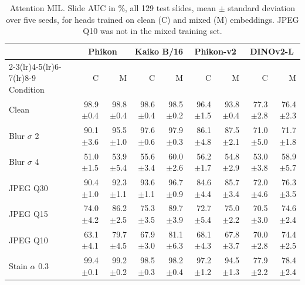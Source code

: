 \begin{table}[H]\centering\small
\caption{Attention MIL. Slide AUC in \%, all 129 test slides, mean $\pm$ standard deviation over five seeds, for heads trained on clean (C) and mixed (M) embeddings. JPEG Q10 was not in the mixed training set.}
\label{tab:app-abmil}
\setlength{\tabcolsep}{3.5pt}
\begin{tabular}{lrrrrrrrr}
\toprule
 & \multicolumn{2}{c}{Phikon} & \multicolumn{2}{c}{Kaiko B/16} & \multicolumn{2}{c}{Phikon-v2} & \multicolumn{2}{c}{DINOv2-L}\\
\cmidrule(lr){2-3}\cmidrule(lr){4-5}\cmidrule(lr){6-7}\cmidrule(lr){8-9}
Condition & C & M & C & M & C & M & C & M\\
\midrule
Clean & 98.9{\scriptsize$\pm$0.4} & 98.8{\scriptsize$\pm$0.4} & 98.6{\scriptsize$\pm$0.4} & 98.5{\scriptsize$\pm$0.2} & 96.4{\scriptsize$\pm$1.5} & 93.8{\scriptsize$\pm$0.4} & 77.3{\scriptsize$\pm$2.8} & 76.4{\scriptsize$\pm$2.3}\\
Blur $\sigma$ 2 & 90.1{\scriptsize$\pm$3.6} & 95.5{\scriptsize$\pm$1.0} & 97.6{\scriptsize$\pm$0.6} & 97.9{\scriptsize$\pm$0.3} & 86.1{\scriptsize$\pm$4.8} & 87.5{\scriptsize$\pm$2.1} & 71.0{\scriptsize$\pm$5.0} & 71.7{\scriptsize$\pm$1.8}\\
Blur $\sigma$ 4 & 51.0{\scriptsize$\pm$1.5} & 53.9{\scriptsize$\pm$5.4} & 55.6{\scriptsize$\pm$3.4} & 60.0{\scriptsize$\pm$2.6} & 56.2{\scriptsize$\pm$1.7} & 54.8{\scriptsize$\pm$2.9} & 53.0{\scriptsize$\pm$3.8} & 58.9{\scriptsize$\pm$5.7}\\
JPEG Q30 & 90.4{\scriptsize$\pm$1.0} & 92.3{\scriptsize$\pm$1.1} & 93.6{\scriptsize$\pm$1.1} & 96.7{\scriptsize$\pm$0.9} & 84.6{\scriptsize$\pm$4.4} & 85.7{\scriptsize$\pm$3.4} & 72.0{\scriptsize$\pm$4.6} & 76.3{\scriptsize$\pm$3.5}\\
JPEG Q15 & 74.0{\scriptsize$\pm$4.2} & 86.2{\scriptsize$\pm$2.5} & 75.3{\scriptsize$\pm$3.5} & 89.7{\scriptsize$\pm$3.9} & 72.7{\scriptsize$\pm$5.4} & 75.0{\scriptsize$\pm$2.2} & 70.5{\scriptsize$\pm$3.0} & 74.6{\scriptsize$\pm$2.4}\\
JPEG Q10 & 63.1{\scriptsize$\pm$4.1} & 79.7{\scriptsize$\pm$4.5} & 67.9{\scriptsize$\pm$3.0} & 81.1{\scriptsize$\pm$6.3} & 68.1{\scriptsize$\pm$4.3} & 67.8{\scriptsize$\pm$3.7} & 70.0{\scriptsize$\pm$2.8} & 74.4{\scriptsize$\pm$2.5}\\
Stain $\alpha$ 0.3 & 99.4{\scriptsize$\pm$0.1} & 99.2{\scriptsize$\pm$0.2} & 98.5{\scriptsize$\pm$0.3} & 98.2{\scriptsize$\pm$0.4} & 97.2{\scriptsize$\pm$1.2} & 94.5{\scriptsize$\pm$1.3} & 77.9{\scriptsize$\pm$2.2} & 78.4{\scriptsize$\pm$2.4}\\
\bottomrule
\end{tabular}
\end{table}

